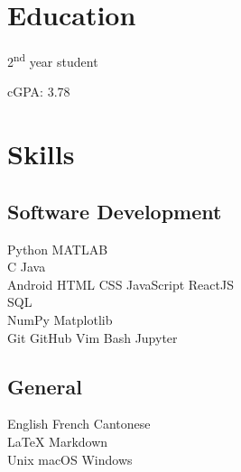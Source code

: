 
\begin{minipage}[t]{0.33\textwidth} %

\section{Education}

\vspace{\topsep} %
\vspace{1pt}
\begin{tightitemize}
\item 2\textsuperscript{nd} year student
\item cGPA: 3.78
\end{tightitemize}


\sectionspace %

\section{Skills}

\subsection{Software Development}
Python \textbullet{}  MATLAB \\
C \textbullet{} Java \\
Android \textbullet{} HTML \textbullet{} CSS \textbullet{} JavaScript ReactJS \\
SQL\\
NumPy \textbullet{} Matplotlib \\
Git \textbullet{} GitHub \textbullet{} Vim \textbullet{} Bash \textbullet{} Jupyter\\
\sectionspace %

\subsection{General}
English \textbullet{} French \textbullet{} Cantonese\\
\LaTeX \textbullet{} Markdown \\
Unix \textbullet{} macOS \textbullet{} Windows\\


\end{minipage}

